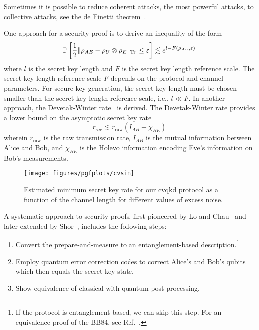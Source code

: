 Sometimes it is possible to reduce coherent attacks, the most powerful attacks, to collective attacks, see the de Finetti theorem~\cite[p.~148]{Wolf2021}.

One approach for a security proof is to derive an inequality of the form~\cite[p.~11]{Scarani2009}
\begin{equation}
	\mathbb{P}\left[
		\frac{1}{2}
		\lVert\rho_{AE}-\rho_U\otimes\rho_E\rVert_{\operatorname{Tr}{}}
		\leq
		\varepsilon
	\right]
	\lesssim
	e^{l-F(\rho_{AE},\varepsilon)}
	\label{eq:qkd_inequality}
\end{equation}
where $l$ is the secret key length and $F$ is the secret key length reference scale.
The secret key length reference scale $F$ depends on the protocol and channel parameters.
For secure key generation, the secret key length must be chosen smaller than the secret key length reference scale, i.e., $l\ll F$.
In another approach, the Devetak-Winter rate~\cite[p.~144]{Wolf2021} is derived.
The Devetak-Winter rate provides a lower bound on the asymptotic secret key rate
\begin{equation}
	r_\text{sec}
	\lesssim
	r_\text{raw}
	(I_{AB}-\chi_{BE})
\end{equation}
wherein $r_\text{raw}$ is the raw transmission rate, $I_{AB}$ is the mutual information between Alice and Bob, and $\chi_{BE}$ is the Holevo information encoding Eve's information on Bob's measurements.
\begin{figure}[htb]
	\centering
	\texttt{[image: figures/pgfplots/cvsim]}
	\caption{Estimated minimum secret key rate for our \gls{cvqkd} protocol as a function of the channel length for different values of excess noise.}\label{fig:cvsim}
\end{figure}

A systematic approach to security proofs, first pioneered by Lo and Chau~\cite{Lo1999} and later extended by Shor~\cite{Shor2000}, includes the following steps:
\begin{enumerate}
	\item Convert the prepare-and-measure to an entanglement-based description.\footnote{If the protocol is entanglement-based, we can skip this step. For an equivalence proof of the BB84, see Ref.~\cite[p.~106]{Wolf2021}.}
	\item Employ quantum error correction codes to correct Alice's and Bob's qubits which then equals the secret key state.
	\item Show equivalence of classical with quantum post-processing.
\end{enumerate}
